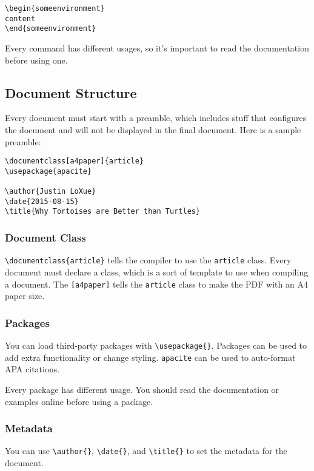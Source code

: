 \documentclass{chan}
\begin{document}
\begin{lstlisting}
\begin{someenvironment}
content
\end{someenvironment}
\end{lstlisting}

Every command has different usages, so it's important to read the documentation before using one.

\subsection{Document Structure}

Every document must start with a preamble, which includes stuff that configures the document and will not be displayed in the final document.
Here is a sample preamble:

\begin{lstlisting}
\documentclass[a4paper]{article}
\usepackage{apacite}

\author{Justin LoXue}
\date{2015-08-15}
\title{Why Tortoises are Better than Turtles}
\end{lstlisting}

\subsubsection{Document Class}

\lstinline$\documentclass{article}$ tells the compiler to use the \verb$article$ class.
Every document must declare a class, which is a sort of template to use when compiling a document.
The \verb$[a4paper]$ tells the \verb$article$ class to make the PDF with an A4 paper size.

\subsubsection{Packages}

You can load third-party packages with \lstinline$\usepackage{}$.
Packages can be used to add extra functionality or change styling.
\verb$apacite$ can be used to auto-format APA citations.

Every package has different usage.
You should read the documentation or examples online before using a package.

\subsubsection{Metadata}

You can use \lstinline$\author{}$, \lstinline$\date{}$, and \lstinline$\title{}$ to set the metadata for the document.
\end{document}
